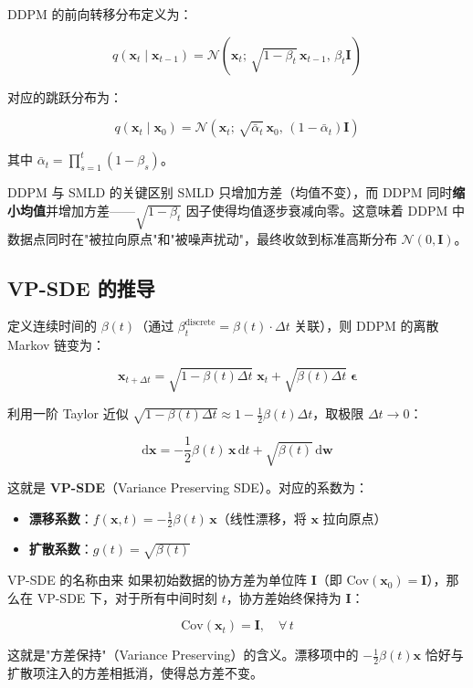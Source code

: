 \documentclass[a4paper]{article}
\begin{document}
DDPM 的前向转移分布定义为：

$$
q(\mathbf{x}_t \mid \mathbf{x}_{t-1}) = \mathcal{N}\!\left(\mathbf{x}_t;\, \sqrt{1-\beta_t}\,\mathbf{x}_{t-1},\, \beta_t \mathbf{I}\right)
$$

对应的跳跃分布为：

$$
q(\mathbf{x}_t \mid \mathbf{x}_0) = \mathcal{N}\!\left(\mathbf{x}_t;\, \sqrt{\bar{\alpha}_t}\,\mathbf{x}_0,\, (1 - \bar{\alpha}_t)\mathbf{I}\right)
$$

其中 $\bar{\alpha}_t = \prod_{s=1}^{t}(1-\beta_s)$。

\begin{warningbox}{DDPM 与 SMLD 的关键区别}
SMLD 只增加方差（均值不变），而 DDPM 同时\textbf{缩小均值}并增加方差——$\sqrt{1-\beta_t}$ 因子使得均值逐步衰减向零。这意味着 DDPM 中数据点同时在"被拉向原点"和"被噪声扰动"，最终收敛到标准高斯分布 $\mathcal{N}(0, \mathbf{I})$。
\end{warningbox}

\subsection{VP-SDE 的推导}

定义连续时间的 $\beta(t)$（通过 $\beta_t^{\text{discrete}} = \beta(t) \cdot \Delta t$ 关联），则 DDPM 的离散 Markov 链变为：

$$
\mathbf{x}_{t+\Delta t} = \sqrt{1 - \beta(t)\Delta t}\;\mathbf{x}_t + \sqrt{\beta(t)\Delta t}\;\boldsymbol{\epsilon}
$$

利用一阶 Taylor 近似 $\sqrt{1 - \beta(t)\Delta t} \approx 1 - \frac{1}{2}\beta(t)\Delta t$，取极限 $\Delta t \to 0$：

$$
\mathrm{d}\mathbf{x} = -\frac{1}{2}\beta(t)\,\mathbf{x}\,\mathrm{d}t + \sqrt{\beta(t)}\,\mathrm{d}\mathbf{w}
$$

这就是 \textbf{VP-SDE}（Variance Preserving SDE）。对应的系数为：

\begin{itemize}
    \item \textbf{漂移系数}：$f(\mathbf{x}, t) = -\frac{1}{2}\beta(t)\,\mathbf{x}$（线性漂移，将 $\mathbf{x}$ 拉向原点）
    \item \textbf{扩散系数}：$g(t) = \sqrt{\beta(t)}$
\end{itemize}

\begin{importantbox}{VP-SDE 的名称由来}
如果初始数据的协方差为单位阵 $\mathbf{I}$（即 $\mathrm{Cov}(\mathbf{x}_0) = \mathbf{I}$），那么在 VP-SDE 下，对于所有中间时刻 $t$，协方差始终保持为 $\mathbf{I}$：

$$
\mathrm{Cov}(\mathbf{x}_t) = \mathbf{I}, \quad \forall\, t
$$

这就是"方差保持"（Variance Preserving）的含义。漂移项中的 $-\frac{1}{2}\beta(t)\mathbf{x}$ 恰好与扩散项注入的方差相抵消，使得总方差不变。
\end{importantbox}
\end{document}
